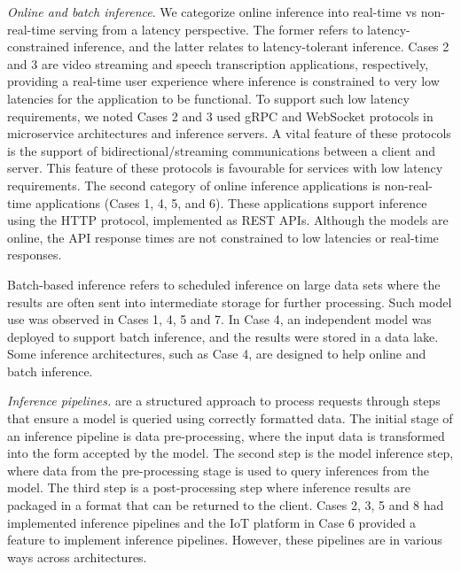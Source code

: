 \textit{Online and batch inference}. We categorize online inference into real-time vs non-real-time serving from a latency perspective. The former refers to latency-constrained inference, and the latter relates to latency-tolerant inference. Cases 2 and 3 are video streaming and speech transcription applications, respectively, providing a real-time user experience where inference is constrained to very low latencies for the application to be functional. To support such low latency requirements, we noted Cases 2 and 3 used gRPC and WebSocket protocols in microservice architectures and inference servers. A vital feature of these protocols is the support of bidirectional/streaming communications between a client and server. This feature of these protocols is favourable for services with low latency requirements. The second category of online inference applications is non-real-time applications (Cases 1, 4, 5, and 6). These applications support inference using the HTTP protocol, implemented as REST APIs. Although the models are online, the API response times are not constrained to low latencies or real-time responses.

Batch-based inference refers to scheduled inference on large data sets where the results are often sent into intermediate storage for further processing. Such model use was observed in Cases 1, 4, 5 and 7. In Case 4, an independent model was deployed to support batch inference, and the results were stored in a data lake. Some inference architectures, such as Case 4, are designed to help online and batch inference.

\textit{Inference pipelines.} are a structured approach to process requests through steps that ensure a model is queried using correctly formatted data. The initial stage of an inference pipeline is data pre-processing, where the input data is transformed into the form accepted by the model. The second step is the model inference step, where data from the pre-processing stage is used to query inferences from the model. The third step is a post-processing step where inference results are packaged in a format that can be returned to the client. Cases 2, 3, 5 and 8 had implemented inference pipelines and the IoT platform in Case 6 provided a feature to implement inference pipelines. However, these pipelines are \DIFdelbegin {}\DIFdelend \DIFaddbegin {}\DIFaddend in various ways across architectures.

